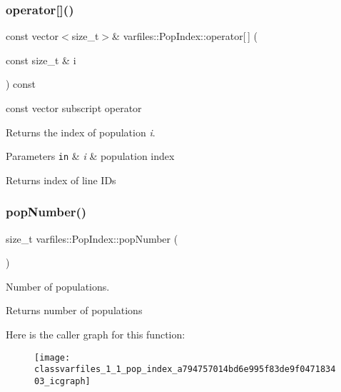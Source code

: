 \subsubsection{\texorpdfstring{operator[]()}{operator[]()}\hspace{0.1cm}{\footnotesize\ttfamily [2/2]}}
{\footnotesize\ttfamily const vector$<$size\+\_\+t$>$\& varfiles\+::\+Pop\+Index\+::operator\mbox{[}$\,$\mbox{]} (\begin{DoxyParamCaption}\item[{const size\+\_\+t \&}]{i }\end{DoxyParamCaption}) const\hspace{0.3cm}{\ttfamily [inline]}}



{\ttfamily const} vector subscript operator 

Returns the index of population {\itshape i}.


\begin{DoxyParams}[1]{Parameters}
\mbox{\tt in}  & {\em i} & population index \\
\hline
\end{DoxyParams}
\begin{DoxyReturn}{Returns}
index of line I\+Ds 
\end{DoxyReturn}
\mbox{\label{classvarfiles_1_1_pop_index_a794757014bd6e995f83de9f047183403}} 
\subsubsection{\texorpdfstring{pop\+Number()}{popNumber()}\hspace{0.1cm}{\footnotesize\ttfamily [1/2]}}
{\footnotesize\ttfamily size\+\_\+t varfiles\+::\+Pop\+Index\+::pop\+Number (\begin{DoxyParamCaption}{ }\end{DoxyParamCaption})\hspace{0.3cm}{\ttfamily [inline]}}



Number of populations. 

\begin{DoxyReturn}{Returns}
number of populations 
\end{DoxyReturn}
Here is the caller graph for this function\+:\nopagebreak
\begin{figure}[H]
\begin{center}
\leavevmode
\texttt{[image: classvarfiles\_1\_1\_pop\_index\_a794757014bd6e995f83de9f047183403\_icgraph]}
\end{center}
\end{figure}
\mbox{\label{classvarfiles_1_1_pop_index_a1bb398f99ba1916ea1b47f599c946e8d}} 
